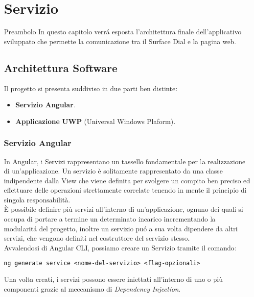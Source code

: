\chapter{Servizio}
\label{chap:serv}
Preambolo
In questo capitolo verrá esposta l'architettura finale dell'applicativo sviluppato che permette la comunicazione tra il Surface Dial e la pagina web.\\
\section{Architettura Software}
Il progetto si presenta suddiviso in due parti ben distinte:
\begin{itemize}
\item \textbf{Servizio Angular}.
\item \textbf{Applicazione UWP} (Universal Windows Plaform).
\end{itemize}

\subsection{Servizio Angular}
In Angular, i Servizi rappresentano un tassello fondamentale per la realizzazione di un'applicazione. Un servizio è solitamente rappresentato da una classe indipendente dalla View che viene definita per svolgere un compito ben preciso ed effettuare delle operazioni strettamente correlate tenendo in mente il principio di singola responsabilità.\\
È possibile definire più servizi all'interno di un'applicazione, ognuno dei quali si occupa di portare a termine un determinato incarico incrementando la modularitá del progetto, inoltre un servizio puó a sua volta dipendere da altri servizi, che vengono definiti nel costruttore del servizio stesso.\\

Avvalendosi di Angular CLI, possiamo creare un Servizio tramite il comando:

\vspace{1.0cm}
\begin{lstlisting}[caption={Esempio creazione servizio},style=javaScriptCode]
	ng generate service <nome-del-servizio> <flag-opzionali>
\end{lstlisting} 
\vspace{1.0cm}
Una volta creati, i servizi possono essere iniettati all'interno di uno o più componenti grazie al meccanismo di \emph{Dependency Injection}.\\

